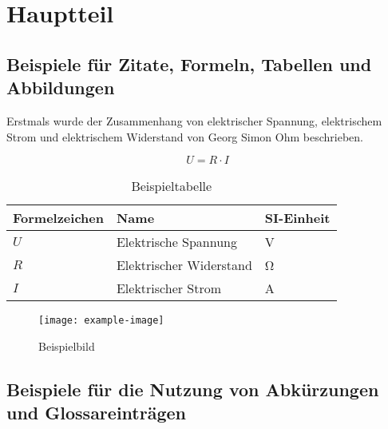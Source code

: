 \chapter{Hauptteil}
\label{chap:Hauptteil}

\section{Beispiele für Zitate, Formeln, Tabellen und Abbildungen}

Erstmals wurde der Zusammenhang von elektrischer Spannung, elektrischem Strom und elektrischem Widerstand von Georg Simon Ohm beschrieben. \cite{Ohm.1827}

\begin{equation}
    U = R \cdot I
\end{equation}

\begin{table}[htbp]
    \centering
    \caption{Beispieltabelle}
    \label{tab:bsp-tabelle}
    \begin{tabular}{lll}
        \toprule
        \textbf{Formelzeichen} & \textbf{Name} & \textbf{SI-Einheit} \\
        \midrule
        $U$ & Elektrische Spannung & \si{\volt} \\
        $R$ & Elektrischer Widerstand & \si{\ohm} \\
        $I$ & Elektrischer Strom & \si{\ampere} \\
        \bottomrule
    \end{tabular}
\end{table}

\begin{figure}[htbp]
    \centering
    \texttt{[image: example-image]} %
    \caption{Beispielbild}
    \label{fig:bsp-bild}
\end{figure}

\section{Beispiele für die Nutzung von Abkürzungen und Glossareinträgen}

